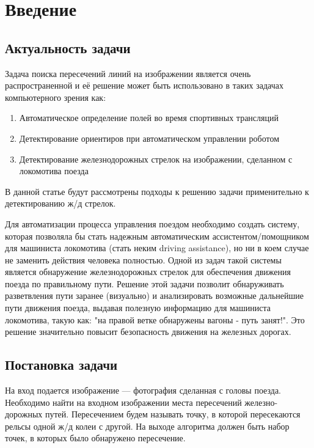 \section{Введение}
\subsection{Актуальность задачи}
Задача поиска пересечений линий на изображении является очень распространенной и её решение может быть использовано в таких задачах компьютерного зрения как:
\begin{enumerate}
	\item Автоматическое определение полей во время спортивных трансляций
	\item Детектирование ориентиров при автоматическом управлении роботом
	\item Детектирование железнодорожных стрелок на изображении, сделанном с локомотива поезда
\end{enumerate} 


В данной статье будут рассмотрены подходы к решению задачи применительно к детектированию ж/д стрелок.


Для автоматизации процесса управления поездом необходимо создать систему, которая позволяла бы стать надежным автоматическим ассистентом/помощником для машиниста локомотива (стать неким driving assistance), но ни в коем случае не заменить действия человека полностью. 
Одной из задач такой системы является обнаружение железнодорожных стрелок для обеспечения движения поезда по правильному пути.
Решение этой задачи позволит обнаруживать разветвления пути заранее (визуально) и анализировать возможные дальнейшие пути движения поезда, выдавая полезную информацию для машиниста локомотива, такую как: "на правой ветке обнаружены вагоны - путь занят!". Это решение значительно повысит безопасность движения на железных дорогах.


\subsection{Постановка задачи}
На вход подается изображение — фотография сделанная с головы поезда. Необходимо найти на входном изображении места пересечений железно-дорожных путей. Пересечением будем называть точку, в которой пересекаются рельсы одной ж/д колеи с другой. На выходе алгоритма должен быть набор точек, в которых было обнаружено пересечение.

